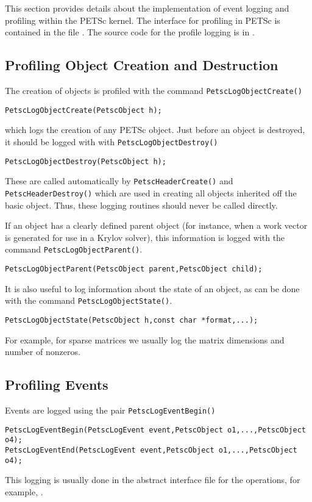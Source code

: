 This section provides details about the implementation of event
logging and profiling within the PETSc kernel.
The interface for profiling in PETSc is contained in the file
\href{http://www.mcs.anl.gov/petsc/petsc-master/include/petsclog.h.html}{}. The source code for the profile logging
is in .

\subsection{Profiling Object Creation and Destruction}

The creation of objects is profiled with the command
 \lstinline{PetscLogObjectCreate()}
\begin{lstlisting}
PetscLogObjectCreate(PetscObject h);
\end{lstlisting}
which logs the creation of any PETSc object.
Just before an object is destroyed, it should be  logged with
with \lstinline{PetscLogObjectDestroy()}
\begin{lstlisting}
PetscLogObjectDestroy(PetscObject h);
\end{lstlisting}
These are called automatically by \lstinline{PetscHeaderCreate()} and
\lstinline{PetscHeaderDestroy()} which are used in creating all objects
inherited off the basic object. Thus, these logging routines should
never be called directly.

If an object has a clearly defined parent object (for instance, when
a work vector is generated for use in a Krylov solver), this information
is logged with the command \lstinline{PetscLogObjectParent()}.
\begin{lstlisting}
PetscLogObjectParent(PetscObject parent,PetscObject child);
\end{lstlisting}
It is also useful to log information about the state of an object, as can
be done with the command \lstinline{PetscLogObjectState()}.
\begin{lstlisting}
PetscLogObjectState(PetscObject h,const char *format,...);
\end{lstlisting}

For example, for sparse matrices we usually log the matrix
dimensions and number of nonzeros.

\subsection{Profiling Events}

Events are logged using the
pair \lstinline{PetscLogEventBegin()}
\begin{lstlisting}
PetscLogEventBegin(PetscLogEvent event,PetscObject o1,...,PetscObject o4);
PetscLogEventEnd(PetscLogEvent event,PetscObject o1,...,PetscObject o4);
\end{lstlisting}
This logging is usually done in the abstract
interface file for the operations, for example, \href{http://www.mcs.anl.gov/petsc/petsc-master/src/mat/interface/matrix.c.html}{}.

